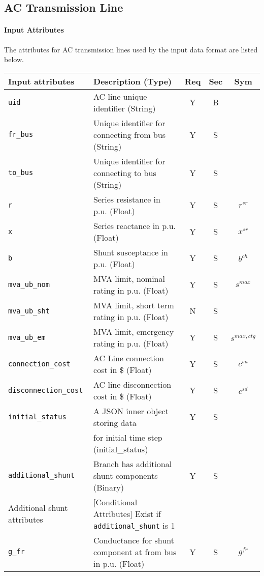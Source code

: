 \documentclass{article}
\begin{document}
\subsection{AC Transmission Line}
\label{nom:line}
\paragraph{Input Attributes}
The attributes for AC transmission lines used by the input data format are listed below.

\begin{center}
\small
\begin{tabular}{ l | l | c | c | c | }
Input attributes & Description (Type)& Req & Sec & Sym\\
\hline
  {\tt uid} & AC line unique identifier (String)& Y & B &  \\
  {\tt fr\_bus} & Unique identifier for connecting from bus (String)& Y & S & \\
  {\tt to\_bus} & Unique identifier for connecting to bus (String)& Y & S & \\
  {\tt r} & Series resistance in p.u. (Float)& Y & S & $r^{sr}$\\
  {\tt x} & Series reactance  in p.u. (Float)& Y & S & $x^{sr}$\\
  {\tt b} & Shunt susceptance in p.u. (Float)& Y & S & $b^{ch}$\\
  {\tt mva\_ub\_nom} & MVA limit, nominal rating in p.u. (Float)& Y & S & $s^{max}$\\
  {\tt mva\_ub\_sht} & MVA limit, short term rating in p.u. (Float)& N & S & \\
  {\tt mva\_ub\_em} & MVA limit, emergency rating in p.u. (Float)& Y & S & $s^{max,ctg}$\\
  {\tt connection\_cost} &    AC Line connection cost in \$ (Float) & Y & S & $c^{su}$\\
  {\tt disconnection\_cost} & AC line disconnection cost in \$ (Float) & Y & S & $c^{sd}$\\
  {\tt initial\_status} & A JSON inner object storing data  & Y & S &  \\
       & for initial time step (initial\_status) &  &  &  \\
  {\tt additional\_shunt} & Branch has additional shunt components (Binary)& Y & S & \\
  \hline
  Additional shunt attributes & [Conditional Attributes] Exist if {\tt additional\_shunt} is 1 &  & & \\
  \hline
  {\tt g\_fr} & Conductance for shunt component at from bus in p.u. (Float)& Y & S & $g^{fr}$\\

\end{tabular}
\end{center}
\end{document}
